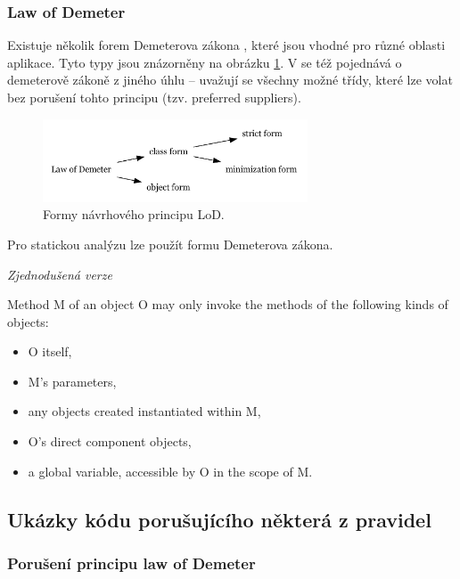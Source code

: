 \subsubsection{Law of Demeter}

Existuje několik forem Demeterova zákona \cite{35588}, které jsou vhodné pro různé oblasti aplikace. Tyto typy jsou znázorněny na obrázku \ref{demeter_law_types}. V \cite{35588} se též pojednává o demeterově zákoně z jiného úhlu -- uvažují se všechny možné třídy, které lze volat bez porušení tohto principu (tzv. preferred suppliers).

\begin{figure}[h!]
  \centering
  \includegraphics[width=0.7\textwidth]{./graphs/demeter_law_types.png}
  \caption{Formy návrhového principu LoD.\label{demeter_law_types}}
\end{figure}

Pro statickou analýzu lze použít  formu Demeterova zákona.


\emph{Zjednodušená verze \cite{wiki:lod}}

Method M of an object O may only invoke the methods of the following kinds of objects:

\begin{itemize}
\item O itself,
\item M's parameters,
\item any objects created instantiated within M,
\item O's direct component objects,
\item a global variable, accessible by O in the scope of M.
\end{itemize}

\subsection{Ukázky kódu porušujícího některá z pravidel}

\subsubsection{Porušení principu law of Demeter}

